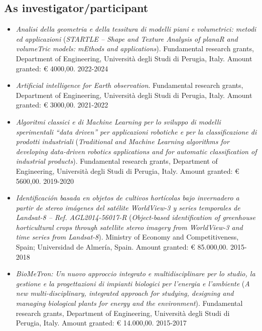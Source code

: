 \documentclass[11pt]{article}
\begin{document}
\subsection*{As investigator/participant}

\begin{itemize}
\item \emph{Analisi della geometria e della tessitura di modelli piani e volumetrici: metodi ed applicazioni} (\emph{STARTLE -- Shape and Texture Analysis of planaR and volumeTric models: mEthods and applications}). Fundamental research grants, Department of Engineering, Università degli Studi di Perugia, Italy. Amount granted: € 4000,00. \hfill 2022-2024

	\item \emph{Artificial intelligence for Earth observation}. Fundamental research grants, Department of Engineering, Università degli Studi di Perugia, Italy. Amount granted: € 3000,00. \hfill 2021-2022
	
	\item \emph{Algoritmi  classici e  di Machine  Learning per lo sviluppo di modelli sperimentali ``data driven'' per applicazioni robotiche e per la classificazione di prodotti industriali} (\emph{Traditional and Machine Learning algorithms for developing data-driven robotics applications and for automatic classification of industrial products}). Fundamental research grants, Department of Engineering, Università degli Studi di Perugia, Italy. Amount granted: € 5600,00. \hfill 2019-2020
	
	\item \emph{Identificación basada en objetos de cultivos hortícolas bajo invernadero a partir de stereo imágenes del satélite WorldView-3 y series temporales de Landsat-8 -- Ref. AGL2014-56017-R} (\emph{Object-based identification of greenhouse horticultural crops through satellite stereo imagery from WorldView-3 and time series from Landsat-8}). Ministry of Economy and Competitiveness, Spain; Universidad de Almería, Spain. Amount granted: € 85.000,00. \hfill 2015-2018
	
	\item \emph{BioMeTron: Un nuovo approccio integrato e multidisciplinare per lo studio, la gestione e la progettazioni di impianti biologici per l'energia e l'ambiente} (\emph{A new multi-disciplinary, integrated approach for studying, designing and managing biological plants for energy and the environment}). Fundamental research grants, Department of Engineering, Università degli Studi di Perugia, Italy. Amount granted: € 14.000,00. \hfill 2015-2017


\end{itemize}
\end{document}
